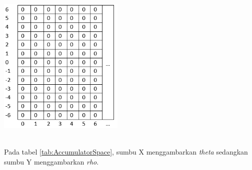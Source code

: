 \begin{adjustbox}{width=1\textwidth}
	\noindent\begin{minipage}{\linewidth}
		\centering\includegraphics[width=6cm]{images/AccumulatorSpace.PNG}
		\label{tab:AccumulatorSpace}
	\end{minipage}
\end{adjustbox}\\

\noindent Pada tabel \ref{tab:AccumulatorSpace}, sumbu X menggambarkan \textit{theta} sedangkan sumbu Y menggambarkan \textit{rho}.

